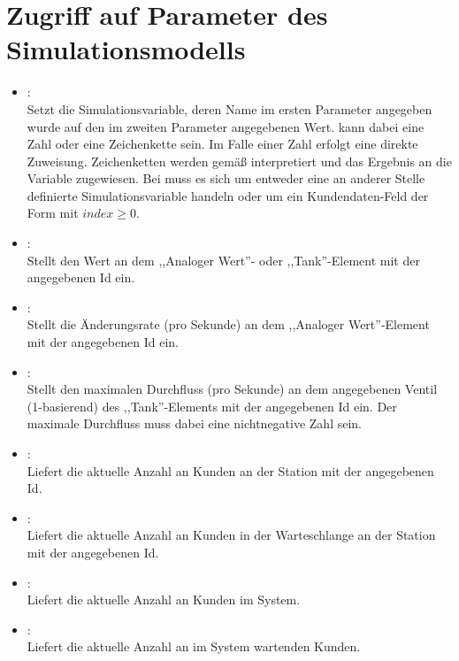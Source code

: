 \section{Zugriff auf Parameter des Simulationsmodells}

\begin{itemize}

\item
{}:\\
Setzt die Simulationsvariable, deren Name im ersten Parameter angegeben wurde auf den im zweiten Parameter angegebenen Wert.
 kann dabei eine Zahl oder eine Zeichenkette sein. Im Falle einer Zahl erfolgt eine direkte Zuweisung.
Zeichenketten werden gemäß  interpretiert und das Ergebnis an die Variable zugewiesen. Bei 
muss es sich um entweder eine an anderer Stelle definierte Simulationsvariable handeln oder um ein Kundendaten-Feld der Form
 mit $index\ge0$. 
  
\item
{}:\\
Stellt den Wert an dem ,,Analoger Wert''- oder ,,Tank''-Element mit der angegebenen Id ein.
  
\item
{}:\\
Stellt die Änderungsrate (pro Sekunde) an dem ,,Analoger Wert''-Element mit der angegebenen Id ein.
  
\item
{}:\\
Stellt den maximalen Durchfluss (pro Sekunde) an dem angegebenen Ventil (1-basierend) des ,,Tank''-Elements mit der angegebenen Id ein.
Der maximale Durchfluss muss dabei eine nichtnegative Zahl sein. 
  
\item
{}:\\
Liefert die aktuelle Anzahl an Kunden an der Station mit der angegebenen Id.
  
\item
{}:\\
Liefert die aktuelle Anzahl an Kunden in der Warteschlange an der Station mit der angegebenen Id.

\item
{}:\\
Liefert die aktuelle Anzahl an Kunden im System.
  
\item
{}:\\
Liefert die aktuelle Anzahl an im System wartenden Kunden.

\end{itemize}

